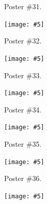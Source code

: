 \documentclass[a4paper,12pt,oneside]{article}
\newcommand{\embed}[5]{\begin{center}\texttt{[image: \#5]}\end{center}\clearpage}
\newcommand{\onlyposter}[1]{\centerline{\small\noindent Poster \##1.}}
\begin{document}
\onlyposter{31}
\embed{2.5cm}{4cm}{1.5cm}{2.75cm}{6-molgenis.pdf}

\onlyposter{32}
\embed{2.5cm}{12cm}{2.25cm}{2.65cm}{13-SPINGO.pdf}

\onlyposter{33}
\embed{2.5cm}{12cm}{1.8cm}{2.85cm}{51-ANNOgesic.pdf}

\onlyposter{34}
\embed{2.5cm}{3.25cm}{1cm}{2.8cm}{44-bioxsd.pdf}

\onlyposter{35}
\embed{2.5cm}{12cm}{2.25cm}{2.85cm}{60-mgkit.pdf}

\onlyposter{36}
\embed{2.5cm}{2.5cm}{0.25cm}{2.65cm}{64-annot-nf.pdf}

\end{document}
